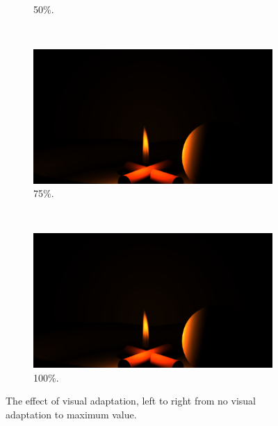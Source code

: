 \begin{figure}[htpb]
\begin{subfigure}[t]{0.2\textwidth}
                \caption{50\%.}
        \end{subfigure}%
        ~ 
        \begin{subfigure}[t]{0.2\textwidth}
                \includegraphics[width=\textwidth, trim={14.5cm 2.5cm 16.5cm 10.5cm}, clip]{img/result_propane_0_75_v}
                \caption{75\%.}
        \end{subfigure}%
        ~ 
        \begin{subfigure}[t]{0.2\textwidth}
                \includegraphics[width=\textwidth, trim={14.5cm 2.5cm 16.5cm 10.5cm}, clip]{img/result_propane_1_v}
                \caption{100\%.}
        \end{subfigure}%
        \caption{The effect of visual adaptation, left to right from no visual adaptation to maximum value.}
        \label{fig:visual_adaptation_states}
\end{figure}

